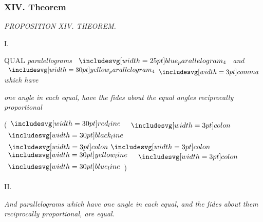 \documentclass[11pt,preview]{standalone}
\begin{document}
\subsubsection{XIV. Theorem}

\begin{minipage}[t]{0.43\textwidth}
    \vspace{15pt}
    
\end{minipage}%
\hfill
\begin{minipage}[t]{0.54\textwidth}
    \begin{center}
        \textit{PROPOSITION XIV. THEOREM.}\label{book6pr14} \\
    \end{center}

    \hfill

    \begin{center}
        I.\\
        \raggedright \lettrine[lines=3, loversize=1, nindent=0pt]{}{}QUAL \textit{paralellograms} $\img{blue_parallelogram_4}$ \textit{and} $\img[0][0][30]{yellow_parallelogram_4} \bcomma$ \textit{which have}
    \end{center}
    \raggedright \textit{one angle in each equal, have the ſides about the equal angles reciprocally proportional}
\end{minipage}
\begin{flushright}
    (\hspace{-1ex}$\redline$ $\bcolon$ $\blackline$ $\bbcolon$ $\yellowline$ $\bcolon$ $\blueline$\hspace{-1ex})%
\end{flushright}
\begin{minipage}[t]{0.43\textwidth}
    \phantom{}
\end{minipage}%
\begin{minipage}[t]{0.54\textwidth}
    \begin{center}
        II.\\
        \vspace{1ex}
        \raggedright \textit{And parallelograms which have one angle in each equal, and the ſides about them reciprocally proportional, are equal}.
    \end{center}
\end{minipage}
\end{document}
